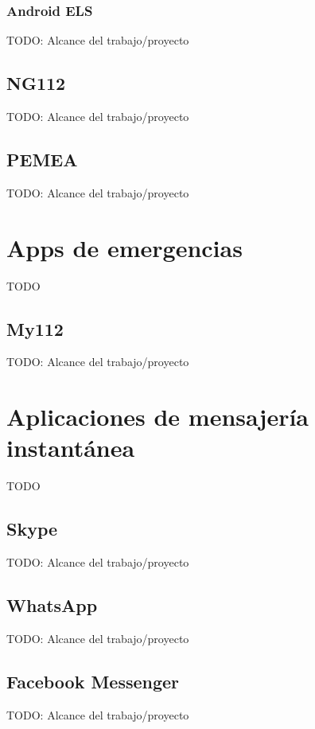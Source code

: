 \subsubsection{Android ELS}

TODO: Alcance del trabajo/proyecto

\subsection{NG112}

TODO: Alcance del trabajo/proyecto

\subsection{PEMEA}

TODO: Alcance del trabajo/proyecto

\section{Apps de emergencias}

TODO

\subsection{My112}

TODO: Alcance del trabajo/proyecto

\section{Aplicaciones de mensajería instantánea}

TODO

\subsection{Skype}

TODO: Alcance del trabajo/proyecto

\subsection{WhatsApp}

TODO: Alcance del trabajo/proyecto

\subsection{Facebook Messenger}

TODO: Alcance del trabajo/proyecto

